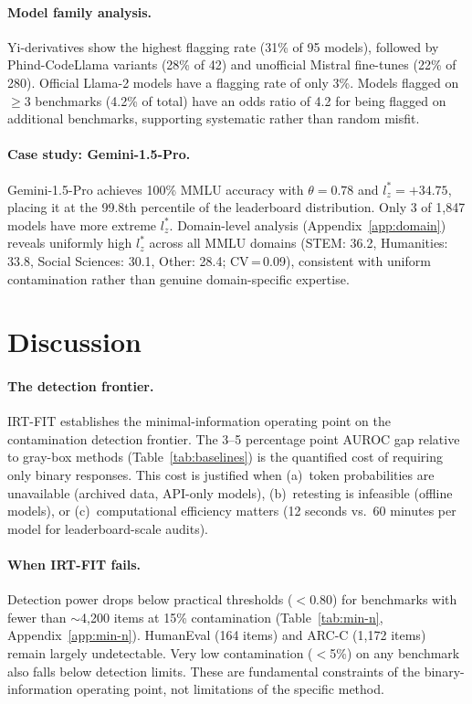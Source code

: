 \documentclass[11pt,a4paper]{article}
\begin{document}
\paragraph{Model family analysis.}
Yi-derivatives show the highest flagging rate (31\% of 95 models), followed by Phind-CodeLlama variants (28\% of 42) and unofficial Mistral fine-tunes (22\% of 280).
Official Llama-2 models have a flagging rate of only 3\%.
Models flagged on $\geq$3 benchmarks (4.2\% of total) have an odds ratio of 4.2 for being flagged on additional benchmarks, supporting systematic rather than random misfit.

\paragraph{Case study: Gemini-1.5-Pro.}
Gemini-1.5-Pro achieves 100\% MMLU accuracy with $\theta = 0.78$ and $l_z^* = +34.75$, placing it at the 99.8th percentile of the leaderboard distribution.
Only 3 of 1{,}847 models have more extreme $l_z^*$.
Domain-level analysis (Appendix~\ref{app:domain}) reveals uniformly high $l_z^*$ across all MMLU domains (STEM: 36.2, Humanities: 33.8, Social Sciences: 30.1, Other: 28.4; CV\,=\,0.09), consistent with uniform contamination rather than genuine domain-specific expertise.

\section{Discussion}

\paragraph{The detection frontier.}
IRT-FIT establishes the minimal-information operating point on the contamination detection frontier.
The 3--5 percentage point AUROC gap relative to gray-box methods (Table~\ref{tab:baselines}) is the quantified cost of requiring only binary responses.
This cost is justified when (a)~token probabilities are unavailable (archived data, API-only models), (b)~retesting is infeasible (offline models), or (c)~computational efficiency matters (12 seconds vs.\ 60 minutes per model for leaderboard-scale audits).

\paragraph{When IRT-FIT fails.}
Detection power drops below practical thresholds ($<$0.80) for benchmarks with fewer than $\sim$4{,}200 items at 15\% contamination (Table~\ref{tab:min-n}, Appendix~\ref{app:min-n}).
HumanEval (164 items) and ARC-C (1{,}172 items) remain largely undetectable.
Very low contamination ($<$5\%) on any benchmark also falls below detection limits.
These are fundamental constraints of the binary-information operating point, not limitations of the specific method.
\end{document}
